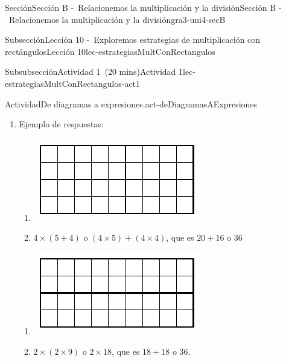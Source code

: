 \documentclass[oneside,10pt,]{article}
\begin{document}
\begin{sectionptx}{Sección}{Sección B -~Relacionemos la multiplicación y la división}{}{Sección B -~Relacionemos la multiplicación y la división}{}{}{gra3-uni4-secB}
\begin{subsectionptx}{Subsección}{Lección 10 -~Exploremos estrategias de multiplicación con rectángulos}{}{Lección 10}{}{}{lec-estrategiasMultConRectangulos}
\begin{subsubsectionptx}{Subsubsección}{Actividad 1~(20 mins)}{}{Actividad 1}{}{}{lec-estrategiasMultConRectangulos-act1}
\begin{activity}{Actividad}{De diagramas a expresiones.}{act-deDiagramasAExpresiones}
\begin{enumerate}
\begin{enumerate}
\end{enumerate}
\item{}Ejemplo de respuestas:%
\begin{sidebyside}{2}{0}{0}{0}%
\begin{sbspanel}{0.5}%
%
\begin{enumerate}
\item{}\includegraphics[width=\linewidth]{external/svg-source/tikz-file-153049.pdf}
%
\item{}\(4 \times (5 + 4)\) o \((4 \times 5) + (4 \times 4)\), que es \(20 + 16\) o 36%
\end{enumerate}
\end{sbspanel}%
\begin{sbspanel}{0.5}%
%
\begin{enumerate}
\item{}\includegraphics[width=\linewidth]{external/svg-source/tikz-file-153050.pdf}
%
\item{}\(2 \times (2\times 9)\) o \(2 \times 18\), que es \(18 + 18\) o 36.%
\end{enumerate}
\end{sbspanel}%
\end{sidebyside}%
\end{enumerate}
\end{activity}%

\end{subsubsectionptx}
\end{subsectionptx}
\end{sectionptx}
\end{document}

